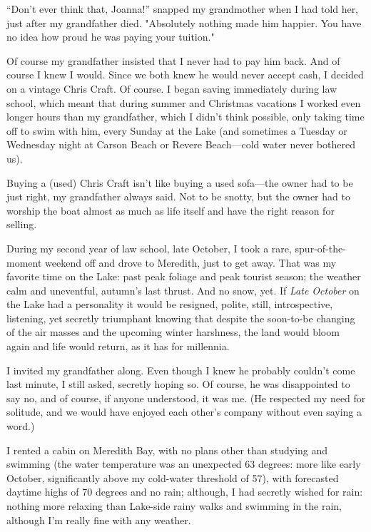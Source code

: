 ``Don't ever think that, Joanna!'' snapped my grandmother when I had
told her, just after my grandfather died. "Absolutely nothing made him
happier. You have no idea how proud he was paying your tuition."

Of course my grandfather insisted that I never had to pay him back. And
of course I knew I would. Since we both knew he would never accept cash,
I decided on a vintage Chris Craft. Of course. I began saving
immediately during law school, which meant that during summer and
Christmas vacations I worked even longer hours than my grandfather,
which I didn't think possible, only taking time off to swim with him,
every Sunday at the Lake (and sometimes a Tuesday or Wednesday night at
Carson Beach or Revere Beach---cold water never bothered us).

Buying a (used) Chris Craft isn't like buying a used sofa---the owner
had to be just right, my grandfather always said. Not to be snotty, but
the owner had to worship the boat almost as much as life itself and have
the right reason for selling.

During my second year of law school, late October, I took a rare,
spur-of-the-moment weekend off and drove to Meredith, just to get away.
That was my favorite time on the Lake: past peak foliage and peak
tourist season; the weather calm and uneventful, autumn's last thrust.
And no snow, yet. If \emph{Late October} on the Lake had a personality
it would be resigned, polite, still, introspective, listening, yet
secretly triumphant knowing that despite the soon-to-be changing of the
air masses and the upcoming winter harshness, the land would bloom again
and life would return, as it has for millennia.

I invited my grandfather along. Even though I knew he probably couldn't
come last minute, I still asked, secretly hoping so. Of course, he was
disappointed to say no, and of course, if anyone understood, it was me.
(He respected my need for solitude, and we would have enjoyed each
other's company without even saying a word.)

I rented a cabin on Meredith Bay, with no plans other than studying and
swimming (the water temperature was an unexpected 63 degrees: more like
early October, significantly above my cold-water threshold of 57), with
forecasted daytime highs of 70 degrees and no rain; although, I had
secretly wished for rain: nothing more relaxing than Lake-side rainy
walks and swimming in the rain, although I'm really fine with any
weather.


